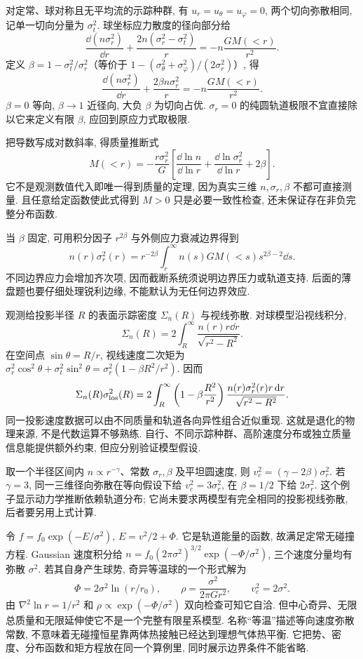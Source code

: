 对定常、球对称且无平均流的示踪种群, 有 $u_r=u_\theta=u_\varphi=0$, 两个切向弥散相同, 记单一切向分量为 $\sigma_t^2$. 球坐标应力散度的径向部分给
\[
\frac{\dd(n\sigma_r^2)}{\dd r}
+\frac{2n(\sigma_r^2-\sigma_t^2)}r
=-n\frac{GM(<r)}{r^2}.
\]
定义 $\beta=1-\sigma_t^2/\sigma_r^2$（等价于 $1-(\sigma_\theta^2+\sigma_\varphi^2)/(2\sigma_r^2)$）, 得
\[
\frac{\dd(n\sigma_r^2)}{\dd r}+
\frac{2\beta n\sigma_r^2}r=-n\frac{GM(<r)}{r^2}.
\]
$\beta=0$ 等向, $\beta\to1$ 近径向, 大负 $\beta$ 为切向占优. $\sigma_r=0$ 的纯圆轨道极限不宜直接除以它来定义有限 $\beta$, 应回到原应力式取极限.

把导数写成对数斜率, 得质量推断式
\[
M(<r)=-\frac{r\sigma_r^2}{G}
\left[\frac{\dd\ln n}{\dd\ln r}
+\frac{\dd\ln\sigma_r^2}{\dd\ln r}+2\beta\right].
\]
它不是观测数值代入即唯一得到质量的定理, 因为真实三维 $n,\sigma_r,\beta$ 不都可直接测量. 且任意给定函数使此式得到 $M>0$ 只是必要一致性检查, 还未保证存在非负完整分布函数.

当 $\beta$ 固定, 可用积分因子 $r^{2\beta}$ 与外侧应力衰减边界得到
\[
n(r)\sigma_r^2(r)=r^{-2\beta}\int_r^\infty
n(s)GM(<s)s^{2\beta-2}\dd s.
\]
不同边界应力会增加齐次项, 因而截断系统须说明边界压力或轨道支持. 后面的薄盘题也要仔细处理锐利边缘, 不能默认为无任何边界效应.

观测给投影半径 $R$ 的表面示踪密度 $\Sigma_n(R)$ 与视线弥散. 对球模型沿视线积分,
\[
\Sigma_n(R)=2\int_R^\infty\frac{n(r)r\dd r}{\sqrt{r^2-R^2}}.
\]
在空间点 $\sin\theta=R/r$, 视线速度二次矩为 $\sigma_r^2\cos^2\theta+\sigma_t^2\sin^2\theta=\sigma_r^2(1-\beta R^2/r^2)$. 因而
\[
\Sigma_n(R)\sigma_{\rm los}^2(R)=2\int_R^\infty
\left(1-\beta\frac{R^2}{r^2}\right)
\frac{n(r)\sigma_r^2(r)r\,\mathrm d r}{\sqrt{r^2-R^2}}.
\]
同一投影速度数据可以由不同质量和轨道各向异性组合近似重现. 这就是退化的物理来源, 不是代数运算不够熟练. 自行、不同示踪种群、高阶速度分布或独立质量信息能提供额外约束, 但应分别验证模型假设.

\begin{example}
取一个半径区间内 $n\propto r^{-\gamma}$、常数 $\sigma_r,\beta$ 及平坦圆速度, 则 $v_c^2=(\gamma-2\beta)\sigma_r^2$. 若 $\gamma=3$, 同一三维径向弥散在等向假设下给 $v_c^2=3\sigma_r^2$, 在 $\beta=1/2$ 下给 $2\sigma_r^2$. 这个例子显示动力学推断依赖轨道分布; 它尚未要求两模型有完全相同的投影视线弥散, 后者要另用上式计算.
\end{example}

令 $f=f_0\exp(-E/\sigma^2)$, $E=v^2/2+\Phi$. 它是轨道能量的函数, 故满足定常无碰撞方程. Gaussian 速度积分给 $n=f_0(2\pi\sigma^2)^{3/2}\exp(-\Phi/\sigma^2)$, 三个速度分量均有弥散 $\sigma^2$. 若其自身产生球势, 奇异等温球的一个形式解为
\[
\Phi=2\sigma^2\ln(r/r_0),\qquad
\rho=\frac{\sigma^2}{2\pi Gr^2},\qquad
v_c^2=2\sigma^2.
\]
由 $\nabla^2\ln r=1/r^2$ 和 $\rho\propto\exp(-\Phi/\sigma^2)$ 双向检查可知它自洽. 但中心奇异、无限总质量和无限延伸使它不是一个完整有限星系模型. 名称“等温”描述等向速度弥散常数, 不意味着无碰撞恒星靠两体热接触已经达到理想气体热平衡. 它把势、密度、分布函数和矩方程放在同一个算例里, 同时展示边界条件不能省略.
